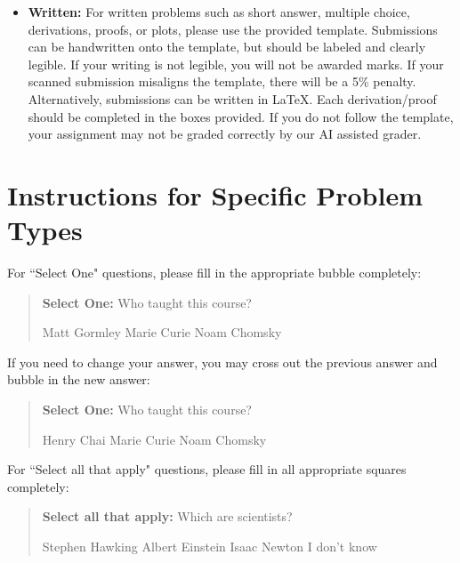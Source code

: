 \documentclass[11pt,addpoints,answers]{exam}
\newcommand{\blackcircle}{\tikz\draw[black,fill=black] (0,0) circle (1ex);}
\begin{document}
\begin{itemize}
\begin{itemize}
   \item \textbf{Written:} For written problems such as short answer, multiple choice, derivations, proofs, or plots, please use the provided template. Submissions can be handwritten onto the template, but should be labeled and clearly legible. If your writing is not legible, you will not be awarded marks. If your scanned submission misaligns the template, there will be a 5\% penalty. Alternatively, submissions can be written in LaTeX. 
   Each derivation/proof should be completed in the boxes provided. If you do not follow the template, your assignment may not be graded correctly by our AI assisted grader.
  \end{itemize}

\end{itemize}\clearpage

\section*{Instructions for Specific Problem Types}

For ``Select One" questions, please fill in the appropriate bubble completely:

\begin{quote}
\textbf{Select One:} Who taught this course?
    \begin{checkboxes}
     \CorrectChoice Matt Gormley
     \choice Marie Curie
     \choice Noam Chomsky
    \end{checkboxes}
\end{quote}

If you need to change your answer, you may cross out the previous answer and bubble in the new answer:

\begin{quote}
\textbf{Select One:} Who taught this course?
    {
    \begin{checkboxes}
     \CorrectChoice Henry Chai
     \choice Marie Curie \checkboxchar{\xcancel{\blackcircle}{}}
     \choice Noam Chomsky
    \end{checkboxes}
    }
\end{quote}

For ``Select all that apply" questions, please fill in all appropriate squares completely:

\begin{quote}
\textbf{Select all that apply:} Which are scientists?
    {%
    \checkboxchar{$\Box$} \checkedchar{$\blacksquare$} %
    \begin{checkboxes}
    \CorrectChoice Stephen Hawking 
    \CorrectChoice Albert Einstein
    \CorrectChoice Isaac Newton
    \choice I don't know
    \end{checkboxes}
    }
\end{quote}
\end{document}
